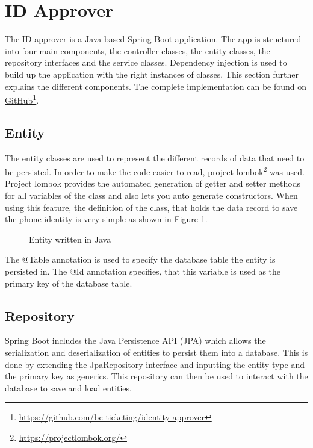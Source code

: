 \section{ID Approver}\label{imp:identity}
The ID approver is a Java based Spring Boot application. The app is structured into four main components, the controller classes, the entity classes, the repository interfaces and the service classes. Dependency injection is used to build up the application with the right instances of classes.
This section further explains the different components. The complete implementation can be found on \href{https://github.com/bc-ticketing/identity-approver}{GitHub}\footnote{\href{https://github.com/bc-ticketing/identity-approver}{https://github.com/bc-ticketing/identity-approver}}.

\subsection{Entity}
The entity classes are used to represent the different records of data that need to be persisted. In order to make the code easier to read, project lombok\footnote{\href{https://projectlombok.org/}{https://projectlombok.org/}} was used. Project lombok provides the automated generation of getter and setter methods for all variables of the class and also lets you auto generate constructors. When using this feature, the definition of the class, that holds the data record to save the phone identity is very simple as shown in Figure \ref{code:entity}. 


\begin{figure}[H]
    
    \caption{Entity written in Java}
    \label{code:entity}
\end{figure}

The @Table annotation is used to specify the database table the entity is persisted in. The @Id annotation specifies, that this variable is used as the primary key of the database table.


\subsection{Repository}
Spring Boot includes the Java Persistence API (JPA) which allows the serialization and deserialization of entities to persist them into a database. This is done by extending the JpaRepository interface and inputting the entity type and the primary key as generics. This repository can then be used to interact with the database to save and load entities. 

